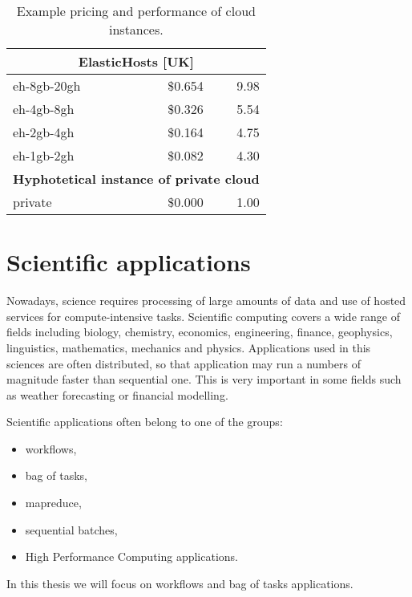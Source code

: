 \begin{table}
\begin{tabular}{| l | r | r |}
    \multicolumn{3}{|c|}{\textbf{ElasticHosts [UK]}}                         \\ \hline
    eh-8gb-20gh       & \$0.654   & 9.98                                     \\ \hline
    eh-4gb-8gh        & \$0.326   & 5.54                                     \\ \hline
    eh-2gb-4gh        & \$0.164   & 4.75                                     \\ \hline
    eh-1gb-2gh        & \$0.082   & 4.30                                     \\ \hline
    \multicolumn{3}{|c|}{\textbf{Hyphotetical instance of private cloud}}    \\ \hline
    private           & \$0.000   & 1.00                                     \\ \hline
  \end{tabular}
  \caption{Example pricing and performance of cloud instances.}
  \label{table:intro:cloud:pricing}  
\end{table}

\section{Scientific applications}

Nowadays, science requires processing of large amounts of data and use of hosted services for compute-intensive tasks. Scientific computing covers a wide range of fields including biology, chemistry, economics, engineering, finance, geophysics, linguistics, mathematics, mechanics and physics. Applications used in this sciences are often distributed, so that application may run a numbers of magnitude faster than sequential one. This is very important in some fields such as weather forecasting or financial modelling. 

Scientific applications often belong to one of the groups: 
\begin{itemize}
  \item workflows,
  \item bag of tasks,
  \item map\-reduce,  
  \item sequential batches,
  \item High Performance Computing applications.
\end{itemize}

In this thesis we will focus on workflows and bag of tasks applications.

